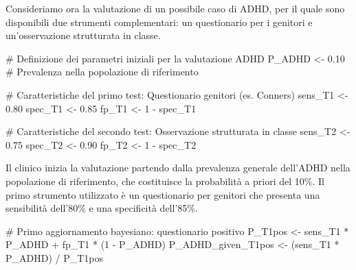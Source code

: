 \documentclass[
  letterpaper,
  DIV=11,
  numbers=noendperiod,
  oneside]{scrreprt}
\newenvironment{Shaded}{\begin{snugshade}}{\end{snugshade}}
\newcommand{\CommentTok}[1]{\textcolor[rgb]{0.37,0.37,0.37}{#1}}
\newcommand{\DecValTok}[1]{\textcolor[rgb]{0.68,0.00,0.00}{#1}}
\newcommand{\FloatTok}[1]{\textcolor[rgb]{0.68,0.00,0.00}{#1}}
\newcommand{\NormalTok}[1]{\textcolor[rgb]{0.00,0.23,0.31}{#1}}
\newcommand{\OtherTok}[1]{\textcolor[rgb]{0.00,0.23,0.31}{#1}}
\newcommand{\SpecialCharTok}[1]{\textcolor[rgb]{0.37,0.37,0.37}{#1}}
\theoremstyle{definition}
\theoremstyle{plain}
\theoremstyle{definition}
\theoremstyle{remark}
\begin{document}
\begin{tcolorbox}[enhanced jigsaw, arc=.35mm, breakable, colbacktitle=quarto-callout-note-color!10!white, opacityback=0, toprule=.15mm, rightrule=.15mm, colback=white, opacitybacktitle=0.6, leftrule=.75mm, coltitle=black, bottomtitle=1mm, left=2mm, toptitle=1mm, title=\textcolor{quarto-callout-note-color}{\faInfo}\hspace{0.5em}{Valore diagnostico incrementale di test multipli}, titlerule=0mm, bottomrule=.15mm, colframe=quarto-callout-note-color-frame]

Consideriamo ora la valutazione di un possibile caso di ADHD, per il
quale sono disponibili due strumenti complementari: un questionario per
i genitori e un'osservazione strutturata in classe.

\begin{Shaded}
\begin{Highlighting}[]
\CommentTok{\# Definizione dei parametri iniziali per la valutazione ADHD}
\NormalTok{P\_ADHD }\OtherTok{\textless{}{-}} \FloatTok{0.10}       \CommentTok{\# Prevalenza nella popolazione di riferimento}

\CommentTok{\# Caratteristiche del primo test: Questionario genitori (es. Conners)}
\NormalTok{sens\_T1 }\OtherTok{\textless{}{-}} \FloatTok{0.80}
\NormalTok{spec\_T1 }\OtherTok{\textless{}{-}} \FloatTok{0.85}
\NormalTok{fp\_T1 }\OtherTok{\textless{}{-}} \DecValTok{1} \SpecialCharTok{{-}}\NormalTok{ spec\_T1}

\CommentTok{\# Caratteristiche del secondo test: Osservazione strutturata in classe}
\NormalTok{sens\_T2 }\OtherTok{\textless{}{-}} \FloatTok{0.75}
\NormalTok{spec\_T2 }\OtherTok{\textless{}{-}} \FloatTok{0.90}
\NormalTok{fp\_T2 }\OtherTok{\textless{}{-}} \DecValTok{1} \SpecialCharTok{{-}}\NormalTok{ spec\_T2}
\end{Highlighting}
\end{Shaded}

Il clinico inizia la valutazione partendo dalla prevalenza generale
dell'ADHD nella popolazione di riferimento, che costituisce la
probabilità a priori del 10\%. Il primo strumento utilizzato è un
questionario per genitori che presenta una sensibilità dell'80\% e una
specificità dell'85\%.

\begin{Shaded}
\begin{Highlighting}[]
\CommentTok{\# Primo aggiornamento bayesiano: questionario positivo}
\NormalTok{P\_T1pos }\OtherTok{\textless{}{-}}\NormalTok{ sens\_T1 }\SpecialCharTok{*}\NormalTok{ P\_ADHD }\SpecialCharTok{+}\NormalTok{ fp\_T1 }\SpecialCharTok{*}\NormalTok{ (}\DecValTok{1} \SpecialCharTok{{-}}\NormalTok{ P\_ADHD)}
\NormalTok{P\_ADHD\_given\_T1pos }\OtherTok{\textless{}{-}}\NormalTok{ (sens\_T1 }\SpecialCharTok{*}\NormalTok{ P\_ADHD) }\SpecialCharTok{/}\NormalTok{ P\_T1pos}


\end{Highlighting}
\end{Shaded}
\end{tcolorbox}
\end{document}
